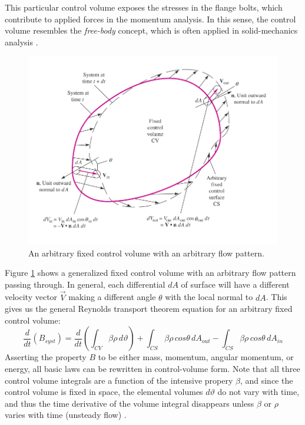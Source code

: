 \documentclass[11pt]{article} %
\numberwithin{equation}{section} %
\begin{document}
This particular control volume exposes the stresses in the flange bolts, which contribute to applied forces in the momentum analysis. In this sense, the control volume resembles the \textit{free-body} concept, which is often applied in solid-mechanics analysis \cite{fluid-mechanics}.
\begin{figure}[h] 
\centering
\includegraphics[scale=0.5]{control_volume}
\caption{An arbitrary fixed control volume with an arbitrary flow pattern.}
\label{fig:control-volume}
\end{figure}

Figure \ref{fig:control-volume} shows a generalized fixed control volume with an arbitrary flow pattern passing through. In general, each differential $dA$ of surface will have a different velocity vector $\vec{V}$ making a different angle $\theta$ with the local normal to $dA$. This gives us the general Reynolds transport theorem equation for an arbitrary fixed control volume:
\begin{equation} \label{eq:long-rtt}
\frac{d}{dt}(B_{syst}) = \frac{d}{dt} \left( \int_{CV} \beta \rho\, d\vartheta \right) + \int_{CS} \beta \rho\, cos\theta\, dA_{out} - \int_{CS} \beta \rho\, cos\theta\, dA_{in}
\end{equation}
Asserting the property $B$ to be either mass, momentum, angular momentum, or energy, all basic laws can be rewritten in control-volume form. Note that all three control volume integrals are a function of the intensive propery $\beta$, and since the control volume is fixed in space, the elemental volumes $d\vartheta$ do not vary with time, and thus the time derivative of the volume integral disappears unless $\beta$ or $\rho$ varies with time (unsteady flow) \cite{fluid-mechanics}.
\end{document}
